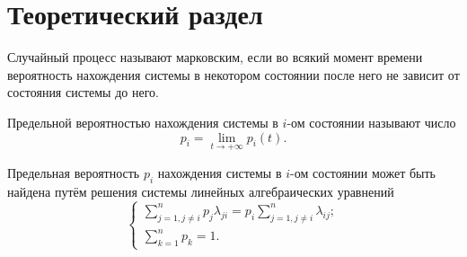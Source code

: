 \chapter{Теоретический раздел}

Случайный процесс называют марковским, если во всякий момент времени
вероятность нахождения системы в некотором состоянии после него не зависит от состояния системы до него.

Предельной вероятностью нахождения системы в \( i \)-ом состоянии называют
число
\[
    p_i = \lim_{t \rightarrow +\infty} p_i(t).
\]

Предельная вероятность \( p_i \) нахождения системы в \( i \)-ом состоянии
может быть найдена путём решения системы линейных алгебраических уравнений
\[
    \begin{cases}
        \sum_{j = 1, j \ne i}^n p_j \lambda_{ji}
            = p_i \sum_{j = 1, j \ne i}^n \lambda_{ij}; \\
        \sum_{k = 1}^n p_k = 1.
    \end{cases}
\]